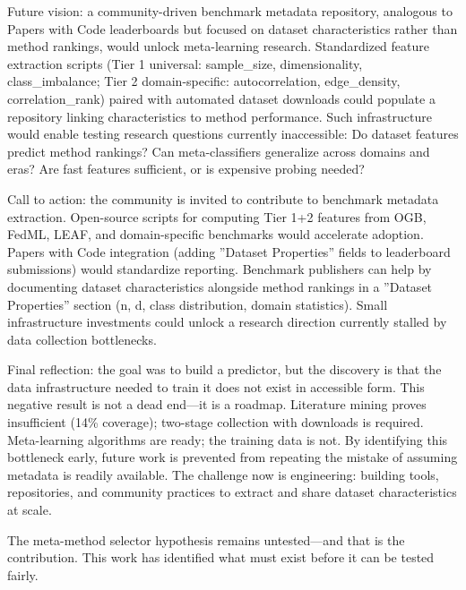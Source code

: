 Future vision: a community-driven benchmark metadata repository, analogous to Papers with Code leaderboards but focused on dataset characteristics rather than method rankings, would unlock meta-learning research. Standardized feature extraction scripts (Tier 1 universal: sample\_size, dimensionality, class\_imbalance; Tier 2 domain-specific: autocorrelation, edge\_density, correlation\_rank) paired with automated dataset downloads could populate a repository linking characteristics to method performance. Such infrastructure would enable testing research questions currently inaccessible: Do dataset features predict method rankings? Can meta-classifiers generalize across domains and eras? Are fast features sufficient, or is expensive probing needed?

Call to action: the community is invited to contribute to benchmark metadata extraction. Open-source scripts for computing Tier 1+2 features from OGB, FedML, LEAF, and domain-specific benchmarks would accelerate adoption. Papers with Code integration (adding ''Dataset Properties'' fields to leaderboard submissions) would standardize reporting. Benchmark publishers can help by documenting dataset characteristics alongside method rankings in a ''Dataset Properties'' section (n, d, class distribution, domain statistics). Small infrastructure investments could unlock a research direction currently stalled by data collection bottlenecks.

Final reflection: the goal was to build a predictor, but the discovery is that the data infrastructure needed to train it does not exist in accessible form. This negative result is not a dead end---it is a roadmap. Literature mining proves insufficient (14\% coverage); two-stage collection with downloads is required. Meta-learning algorithms are ready; the training data is not. By identifying this bottleneck early, future work is prevented from repeating the mistake of assuming metadata is readily available. The challenge now is engineering: building tools, repositories, and community practices to extract and share dataset characteristics at scale.

The meta-method selector hypothesis remains untested---and that is the contribution. This work has identified what must exist before it can be tested fairly.

